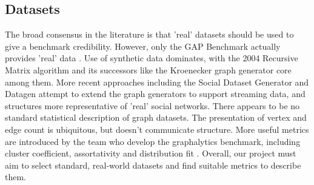 \documentclass[letterpaper, 10pt]{article}
\begin{document}
\begin{multicols}{2}
        \subsection{Datasets}\label{section:datasets}
        \par{The broad consensus in the literature is that 'real' datasets should be used to give a benchmark credibility. However, only the GAP Benchmark actually provides 'real' data \cite{Beamer2017}. 
        Use of synthetic data dominates, with the 2004 Recursive Matrix algorithm \cite{Chakrabarti2004} and its successors like the Kroenecker graph generator \cite{Leskovec2010} core among them. 
        More recent approaches including the Social Dataset Generator \cite{Angles2013} and Datagen \cite{Capota2015} attempt to extend the graph generators to support streaming data, and structures more representative of 'real' social networks.
        There appears to be no standard statistical description of graph datasets. 
        The presentation of vertex and edge count is ubiquitous, but doesn't communicate structure. 
        More useful metrics are introduced by the team who develop the graphalytics benchmark, including cluster coefficient, assortativity and distribution fit \cite{Capota2015}.
        Overall, our project must aim to select standard, real-world datasets and find suitable metrics to describe them.

}
\end{multicols}
\end{document}
